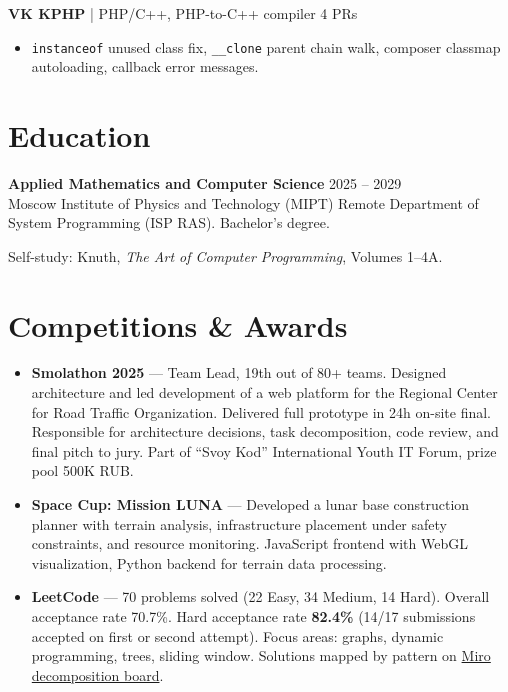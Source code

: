 \documentclass[10pt, a4paper]{article}
\newcommand{\entry}[4]{{\textbf{#1}} \hfill {\small\color{graytext}#2}\\{\small #3 \hfill #4}\vspace{2pt}}
\newcommand{\projentry}[3]{{\textbf{#1}} {\small\color{graytext}| #2} \hfill {\small #3}\\}
\begin{document}
\projentry{VK KPHP}{PHP/C++, PHP-to-C++ compiler}{4 PRs}
\begin{itemize}
\item \texttt{instanceof} unused class fix, \texttt{\_\_clone} parent chain walk, composer classmap autoloading, callback error messages.
\end{itemize}

\vspace{-2pt}

\section{Education}

\entry{Applied Mathematics and Computer Science}{2025 -- 2029}{Moscow Institute of Physics and Technology (MIPT)}{Remote}
{\small Department of System Programming (ISP RAS). Bachelor's degree.}

{\small Self-study: Knuth, \textit{The Art of Computer Programming}, Volumes 1--4A.}

\vspace{-2pt}

\section{Competitions \& Awards}

\begin{itemize}
\item \textbf{Smolathon 2025} --- Team Lead, 19th out of 80+ teams. Designed architecture and led development of a web platform for the Regional Center for Road Traffic Organization. Delivered full prototype in 24h on-site final. Responsible for architecture decisions, task decomposition, code review, and final pitch to jury. Part of ``Svoy Kod'' International Youth IT Forum, prize pool 500K RUB.
\item \textbf{Space Cup: Mission LUNA} --- Developed a lunar base construction planner with terrain analysis, infrastructure placement under safety constraints, and resource monitoring. JavaScript frontend with WebGL visualization, Python backend for terrain data processing.
\item \textbf{LeetCode} --- 70 problems solved (22 Easy, 34 Medium, 14 Hard). Overall acceptance rate 70.7\%. Hard acceptance rate \textbf{82.4\%} (14/17 submissions accepted on first or second attempt). Focus areas: graphs, dynamic programming, trees, sliding window. Solutions mapped by pattern on \href{https://miro.com/app/board/uXjVGcc9d58=/?share_link_id=838442415695}{Miro decomposition board}.
\end{itemize}
\end{document}
